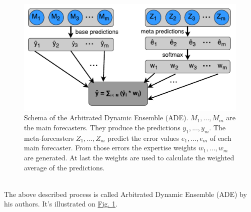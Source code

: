 \documentclass[runningheads,a4paper]{llncs}[2015/06/24]
\begin{document}
\begin{figure}[h]
\centering
\includegraphics[width=\textwidth]{adeSchema}
\caption{Schema of the Arbitrated Dynamic Ensemble (ADE). $M_1, ... ,M_m$ are the main forecasters. They produce the predictions $y_1, ... ,y_m$. The meta-forecasters $Z_1, ... ,Z_m$ predict the error values $e_1, ... ,e_m$ of each main forecaster. From those errors the expertise weights $w_1, ... ,w_m$ are generated. At last the weights are used to calculate the weighted average of the predictions. \cite{VtorCerqueira2017}}
\label{fig:adeSchema}
\end{figure} 
 
\vspace{-\topsep}
\hspace{1cm}\\ The above described process is called Arbitrated Dynamic Ensemble (ADE) by his authors. It's illustrated on \hyperref[fig:adeSchema]{Fig. \ref{fig:adeSchema}}. 
\end{document}
